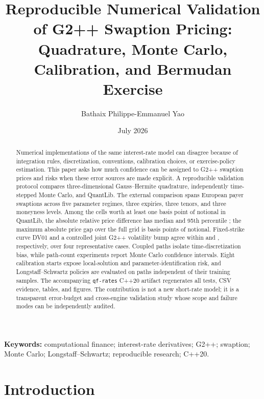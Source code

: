 \documentclass[11pt]{article}
\title{Reproducible Numerical Validation of G2++ Swaption Pricing:\\
Quadrature, Monte Carlo, Calibration, and Bermudan Exercise}
\author{Bathaix Philippe-Emmanuel Yao}
\date{July 2026}
\numberwithin{equation}{section}
\theoremstyle{definition}
\theoremstyle{remark}
\begin{document}
\maketitle

\begin{abstract}
Numerical implementations of the same interest-rate model can disagree because
of integration rules, discretization, conventions, calibration choices, or
exercise-policy estimation. This paper asks how much confidence can be assigned
to G2++ swaption prices and risks when these error sources are made explicit. A
reproducible validation protocol compares three-dimensional Gauss--Hermite
quadrature, independently time-stepped Monte Carlo, and QuantLib. The external
comparison spans \QuantLibGridCells{} European payer swaptions across five
parameter regimes, three expiries, three tenors, and three moneyness levels.
Among the \QuantLibGridMaterialCells{} cells worth at least one basis point of
notional in QuantLib, the absolute relative price difference has median
\QuantLibGridMedianRelativeError{} and 95th percentile
\QuantLibGridNinetyFifthRelativeError; the maximum absolute price gap over the full grid
is \QuantLibGridMaxDifferenceBp{} basis points of notional. Fixed-strike curve
DV01 and a controlled joint G2++ volatility bump agree within
\RiskMaxDVOneDifference{} and \RiskMaxVolatilityDifference, respectively, over
four representative cases. Coupled paths isolate time-discretization bias,
while path-count experiments report Monte Carlo confidence intervals. Eight
calibration starts expose local-solution and parameter-identification risk, and
Longstaff--Schwartz policies are evaluated on paths independent of their
training samples. The accompanying \texttt{qf-rates} C++20 artifact regenerates
all tests, CSV evidence, tables, and figures. The contribution is not a new
short-rate model; it is a transparent error-budget and cross-engine validation
study whose scope and failure modes can be independently audited.
\end{abstract}

\begin{sloppypar}
\noindent\textbf{Keywords:} computational finance; interest-rate derivatives;
G2++; swaption; Monte Carlo; Longstaff--Schwartz; reproducible research; C++20.
\end{sloppypar}

\section{Introduction}
\end{document}
